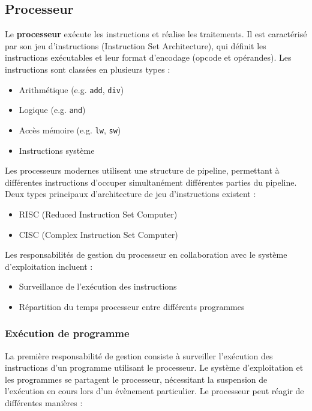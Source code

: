 \subsection{Processeur}


Le \textbf{processeur} exécute les instructions et réalise les traitements. 
Il est caractérisé par son jeu d'instructions (Instruction Set Architecture), qui définit les instructions exécutables et leur format d'encodage (opcode et opérandes). 
Les instructions sont classées en plusieurs types :
\begin{itemize}
    \item Arithmétique (e.g. \texttt{add}, \texttt{div})
    \item Logique (e.g. \texttt{and})
    \item Accès mémoire (e.g. \texttt{lw}, \texttt{sw})
    \item Instructions système
\end{itemize}

Les processeurs modernes utilisent une structure de pipeline, permettant à différentes instructions d'occuper simultanément différentes parties du pipeline. 
Deux types principaux d'architecture de jeu d'instructions existent :
\begin{itemize}
    \item RISC (Reduced Instruction Set Computer)
    \item CISC (Complex Instruction Set Computer)
\end{itemize}

Les responsabilités de gestion du processeur en collaboration avec le système d'exploitation incluent :
\begin{itemize}
    \item Surveillance de l'exécution des instructions
    \item Répartition du temps processeur entre différents programmes
\end{itemize}


\subsubsection{Exécution de programme}

La première responsabilité de gestion consiste à surveiller l'exécution des instructions d'un programme utilisant le processeur. 
Le système d'exploitation et les programmes se partagent le processeur, nécessitant la suspension de l'exécution en cours lors d'un évènement particulier. 
Le processeur peut réagir de différentes manières :

